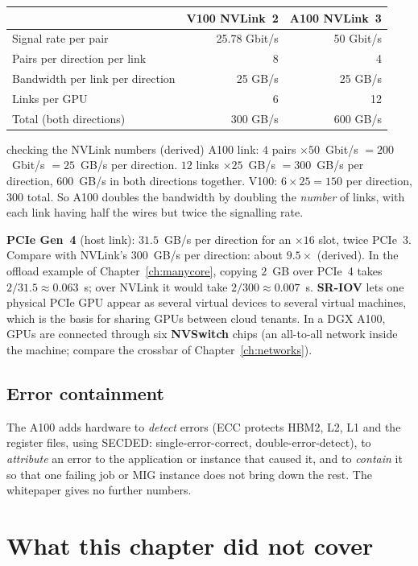 \begin{center}\small
\begin{tabular}{@{}lrr@{}}
\toprule
 & \textbf{V100 NVLink~2} & \textbf{A100 NVLink~3}\\
\midrule
Signal rate per pair & 25.78 Gbit/s & 50 Gbit/s\\
Pairs per direction per link & 8 & 4\\
Bandwidth per link per direction & 25 GB/s & 25 GB/s\\
Links per GPU & 6 & 12\\
Total (both directions) & 300 GB/s & 600 GB/s\\
\bottomrule
\end{tabular}
\end{center}
\begin{workedex}{checking the NVLink numbers (derived)}
A100 link: $4$ pairs $\times50$~Gbit/s $=200$~Gbit/s $=25$~GB/s per direction. $12$ links $\times25$~GB/s $=300$~GB/s per direction, $600$~GB/s in both directions together. V100: $6\times25=150$ per direction, $300$ total.
So A100 doubles the bandwidth by doubling the \emph{number} of links, with each link having half the wires but twice the signalling rate.
\end{workedex}
\textbf{PCIe Gen~4} (host link): $31.5$~GB/s per direction for an $\times16$ slot, twice PCIe~3. Compare with NVLink's $300$~GB/s per direction: about $9.5\times$ (derived).
In the offload example of Chapter~\ref{ch:manycore}, copying $2$~GB over PCIe~4 takes $2/31.5\approx0.063$~s; over NVLink it would take $2/300\approx0.007$~s.
\textbf{SR-IOV} lets one physical PCIe GPU appear as several virtual devices to several virtual machines, which is the basis for sharing GPUs between cloud tenants.
In a DGX A100, GPUs are connected through six \textbf{NVSwitch} chips (an all-to-all network inside the machine; compare the crossbar of Chapter~\ref{ch:networks}).

\subsection{Error containment}
The A100 adds hardware to \emph{detect} errors (ECC protects HBM2, L2, L1 and the register files, using SECDED: single-error-correct, double-error-detect), to \emph{attribute} an error to the application or instance that caused it,
and to \emph{contain} it so that one failing job or MIG instance does not bring down the rest. The whitepaper gives no further numbers.

\section{What this chapter did not cover}
\oos

